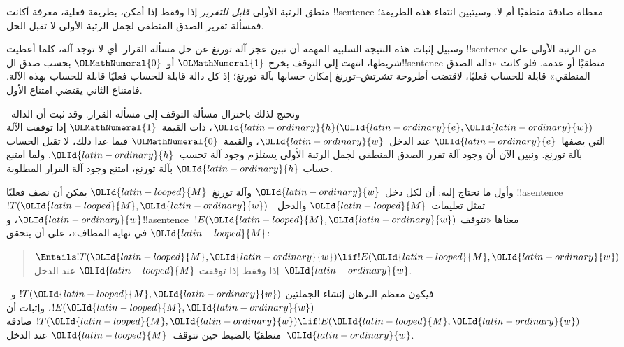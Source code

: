 \documentclass[../../../include/open-logic-section]{subfiles}
\begin{document}

منطق الرتبة الأولى \emph{قابل للتقرير} إذا وفقط إذا أمكن، بطريقة
فعلية، معرفة أكانت !!{sentence} معطاة صادقة منطقيًا أم لا.
وسيتبين انتفاء هذه الطريقة؛ فمسألة تقرير الصدق المنطقي لجمل
الرتبة الأولى لا تقبل الحل.

وسبيل إثبات هذه النتيجة السلبية المهمة أن نبين عجز آلة تورنغ عن
حل مسألة القرار. أي لا توجد آلة، كلما أعطيت !!{sentence} من الرتبة
الأولى على شريطها، انتهت إلى التوقف بخرج $\OLMathNumeral{1}$ أو~$\OLMathNumeral{0}$ بحسب صدق
ال!!{sentence} منطقيًا أو عدمه. فلو كانت «دالة الصدق المنطقي»
قابلة للحساب فعليًا، لاقتضت أطروحة تشرتش--تورنغ إمكان حسابها بآلة
تورنغ؛ إذ كل دالة قابلة للحساب فعليًا قابلة للحساب بهذه الآلة.
فامتناع الثاني يقتضي امتناع الأول.

ونحتج لذلك باختزال مسألة التوقف إلى مسألة القرار. وقد ثبت أن
الدالة~$\OLId{latin-ordinary}{h}(\OLId{latin-ordinary}{e},\OLId{latin-ordinary}{w})$، ذات القيمة~$\OLMathNumeral{1}$ إذا توقفت الآلة التي يصفها~$\OLId{latin-ordinary}{e}$
عند الدخل~$\OLId{latin-ordinary}{w}$، والقيمة~$\OLMathNumeral{0}$ فيما عدا ذلك، لا تقبل الحساب بآلة
تورنغ. ونبين الآن أن وجود آلة تقرر الصدق المنطقي لجمل الرتبة
الأولى يستلزم وجود آلة تحسب~$\OLId{latin-ordinary}{h}$. ولما امتنع حساب $\OLId{latin-ordinary}{h}$ بآلة
تورنغ، امتنع وجود آلة القرار المطلوبة.

وأول ما نحتاج إليه: أن لكل دخل~$\OLId{latin-ordinary}{w}$ وآلة تورنغ~$\OLId{latin-looped}{M}$ يمكن أن
نصف فعليًا !!a{sentence}~$!T(\OLId{latin-looped}{M},\OLId{latin-ordinary}{w})$ تمثل تعليمات~$\OLId{latin-looped}{M}$
والدخل~$\OLId{latin-ordinary}{w}$، و!!a{sentence}~$!E(\OLId{latin-looped}{M},\OLId{latin-ordinary}{w})$ معناها «تتوقف $\OLId{latin-looped}{M}$
في نهاية المطاف»، على أن يتحقق:
\begin{quote}
  $\Entails !T(\OLId{latin-looped}{M},\OLId{latin-ordinary}{w}) \lif !E(\OLId{latin-looped}{M},\OLId{latin-ordinary}{w})$ إذا وفقط إذا توقفت $\OLId{latin-looped}{M}$ عند الدخل~$\OLId{latin-ordinary}{w}$.
\end{quote}
فيكون معظم البرهان إنشاء الجملتين $!T(\OLId{latin-looped}{M},\OLId{latin-ordinary}{w})$ و~$!E(\OLId{latin-looped}{M},\OLId{latin-ordinary}{w})$،
وإثبات أن $!T(\OLId{latin-looped}{M},\OLId{latin-ordinary}{w})\lif !E(\OLId{latin-looped}{M},\OLId{latin-ordinary}{w})$ صادقة منطقيًا بالضبط حين
تتوقف~$\OLId{latin-looped}{M}$ عند الدخل~$\OLId{latin-ordinary}{w}$.
\end{document}
